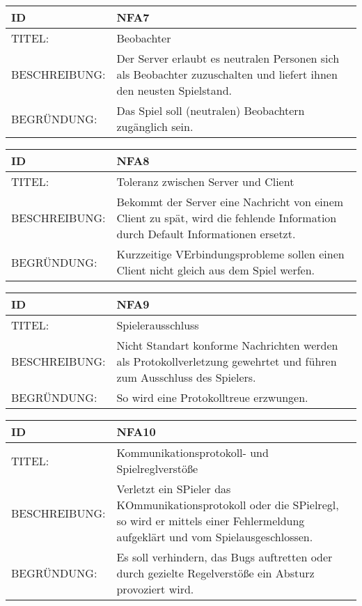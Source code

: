 \documentclass{uulm-assignment}
\begin{document}
    \begin{tabularx}{\textwidth}{|l|X |} \hline
        \textbf{ID} & \textbf{NFA7} \\
        \hline
        TITEL: &  Beobachter\\
        \hline
        BESCHREIBUNG: &  Der Server erlaubt es neutralen Personen sich als Beobachter zuzuschalten und liefert ihnen den neusten Spielstand.\\
        \hline
        BEGRÜNDUNG: &  Das Spiel soll (neutralen) Beobachtern zugänglich sein.\\
        \hline
    \end{tabularx}
    
    \begin{tabularx}{\textwidth}{|l|X |} \hline
        \textbf{ID} & \textbf{NFA8} \\
        \hline
        TITEL: &  Toleranz zwischen Server und Client\\
        \hline
        BESCHREIBUNG: &  Bekommt der Server eine Nachricht von einem Client zu spät, wird die fehlende Information durch Default Informationen ersetzt.\\
        \hline
        BEGRÜNDUNG: &  Kurzzeitige VErbindungsprobleme sollen einen Client nicht gleich aus dem Spiel werfen.\\
        \hline
    \end{tabularx}

    \begin{tabularx}{\textwidth}{|l|X |} \hline
        \textbf{ID} & \textbf{NFA9} \\
        \hline
        TITEL: &  Spielerausschluss\\
        \hline
        BESCHREIBUNG: &  Nicht Standart konforme Nachrichten werden als Protokollverletzung gewehrtet und führen zum Ausschluss des Spielers.\\
        \hline
        BEGRÜNDUNG: &  So wird eine Protokolltreue erzwungen.\\
        \hline
    \end{tabularx}

    \begin{tabularx}{\textwidth}{|l|X |} \hline
        \textbf{ID} & \textbf{NFA10} \\
        \hline
        TITEL: &  Kommunikationsprotokoll- und Spielreglverstöße\\
        \hline
        BESCHREIBUNG: &  Verletzt ein SPieler das KOmmunikationsprotokoll oder die SPielregl, so wird er mittels einer Fehlermeldung aufgeklärt und vom Spielausgeschlossen.\\
        \hline
        BEGRÜNDUNG: &  Es soll verhindern, das Bugs auftretten oder durch gezielte Regelverstöße ein Absturz provoziert wird.\\
        \hline
    \end{tabularx}
\end{document}
